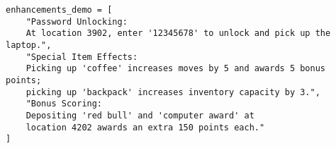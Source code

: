 \documentclass[11pt]{article}
\begin{document}
\begin{verbatim}
enhancements_demo = [
    "Password Unlocking: 
    At location 3902, enter '12345678' to unlock and pick up the laptop.",
    "Special Item Effects: 
    Picking up 'coffee' increases moves by 5 and awards 5 bonus points; 
    picking up 'backpack' increases inventory capacity by 3.",
    "Bonus Scoring: 
    Depositing 'red bull' and 'computer award' at 
    location 4202 awards an extra 150 points each."
]
\end{verbatim}
\end{document}
